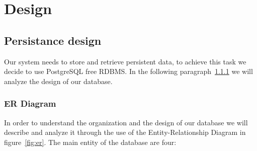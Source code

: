 \chapter{Design} \label{cap:cap3}

\section{Persistance design}
Our system needs to store and retrieve persistent data, to achieve this task we decide to use PostgreSQL free RDBMS. In the following paragraph~\ref{sec:er} we will analyze the design of our database.
\subsection{ER Diagram}\label{sec:er}
In order to understand the organization and the design of our database we will describe and analyze it through the use of the Entity-Relationship Diagram in figure~\ref{fig:er}.
The main entity of the database are four:
